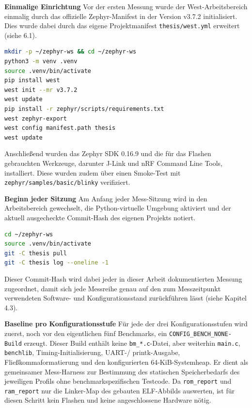 \textbf{Einmalige Einrichtung }Vor der ersten Messung wurde der West-Arbeitsbereich einmalig durch das offizielle Zephyr-Manifest in der Version v3.7.2 initialisiert. Dies wurde dabei durch das eigene Projektmanifest \lstinline[style=codeinline]|thesis/west.yml| erweitert (siehe 6.1).

\begin{lstlisting}[style=basecode,language=bash]
mkdir -p ~/zephyr-ws && cd ~/zephyr-ws
python3 -m venv .venv
source .venv/bin/activate
pip install west
west init --mr v3.7.2
west update
pip install -r zephyr/scripts/requirements.txt
west zephyr-export
west config manifest.path thesis
west update
\end{lstlisting}
Anschlie{\ss}end wurden das Zephyr SDK 0.16.9 und die f{\"u}r das Flashen gebrauchten Werkzeuge, darunter J-Link und nRF Command Line Tools, installiert. Diese wurden zudem {\"u}ber einen Smoke-Test mit \lstinline[style=codeinline]|zephyr/samples/basic/blinky| verifiziert.

\textbf{Beginn jeder Sitzung }Am Anfang jeder Mess-Sitzung wird in den Arbeitsbereich gewechselt, die Python-virtuelle Umgebung aktiviert und der aktuell ausgecheckte Commit-Hash des eigenen Projekts notiert.

\begin{lstlisting}[style=basecode,language=bash]
cd ~/zephyr-ws
source .venv/bin/activate
git -C thesis pull
git -C thesis log --oneline -1
\end{lstlisting}
Dieser Commit-Hash wird dabei jeder in dieser Arbeit dokumentierten Messung zugeordnet, damit sich jede Messreihe genau auf den zum Messzeitpunkt verwendeten Software- und Konfigurationsstand zur{\"u}ckf{\"u}hren l{\"a}sst (siehe Kapitel 4.3).

\textbf{Baseline pro Konfigurationsstufe }F{\"u}r jede der drei Konfigurationsstufen wird zuerst, noch vor den eigentlichen f{\"u}nf Benchmarks, ein \lstinline[style=codeinline]|CONFIG_BENCH_NONE-Build| erzeugt. Dieser Build enth{\"a}lt keine \lstinline[style=codeinline]|bm_*.c|-Datei, aber weiterhin \lstinline[style=codeinline]|main.c|, \lstinline[style=codeinline]|benchlib|, Timing-Initialisierung, UART-/ printk-Ausgabe, Flie{\ss}kommaformatierung und den konfigurierten 64-KiB-Systemheap. Er dient als gemeinsamer Mess-Harness zur Bestimmung des statischen Speicherbedarfs des jeweiligen Profils ohne benchmarkspezifischen Testcode. Da \lstinline[style=codeinline]|rom_report| und \lstinline[style=codeinline]|ram_report| nur die Linker-Map des gebauten ELF-Abbilds auswerten, ist f{\"u}r diesen Schritt kein Flashen und keine angeschlossene Hardware n{\"o}tig.

